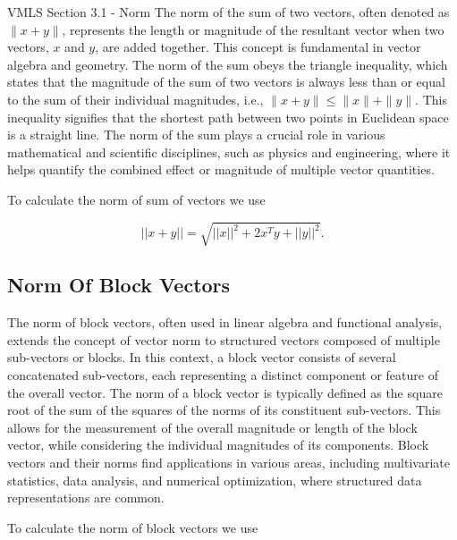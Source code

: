 \begin{notes}{VMLS Section 3.1 - Norm}
    The norm of the sum of two vectors, often denoted as $\|x + y\|$, represents the length or magnitude of the resultant vector when two vectors, $x$ and $y$, are added together. This concept is fundamental in vector 
    algebra and geometry. The norm of the sum obeys the triangle inequality, which states that the magnitude of the sum of two vectors is always less than or equal to the sum of their individual magnitudes, i.e., 
    $\|x + y\| \leq \|x\| + \|y\|$. This inequality signifies that the shortest path between two points in Euclidean space is a straight line. The norm of the sum plays a crucial role in various mathematical and 
    scientific disciplines, such as physics and engineering, where it helps quantify the combined effect or magnitude of multiple vector quantities.

    \begin{highlight}
        To calculate the norm of sum of vectors we use

        \begin{equation*}
            ||x + y|| = \sqrt{||x||^{2} + 2x^{T}y + ||y||^{2}}.
        \end{equation*}
    \end{highlight}

    \subsection*{Norm Of Block Vectors}

    The norm of block vectors, often used in linear algebra and functional analysis, extends the concept of vector norm to structured vectors composed of multiple sub-vectors or blocks. In this context, a block 
    vector consists of several concatenated sub-vectors, each representing a distinct component or feature of the overall vector. The norm of a block vector is typically defined as the square root of the sum of 
    the squares of the norms of its constituent sub-vectors. This allows for the measurement of the overall magnitude or length of the block vector, while considering the individual magnitudes of its components. 
    Block vectors and their norms find applications in various areas, including multivariate statistics, data analysis, and numerical optimization, where structured data representations are common.

    \begin{highlight}
        To calculate the norm of block vectors we use


\end{highlight}
\end{notes}
